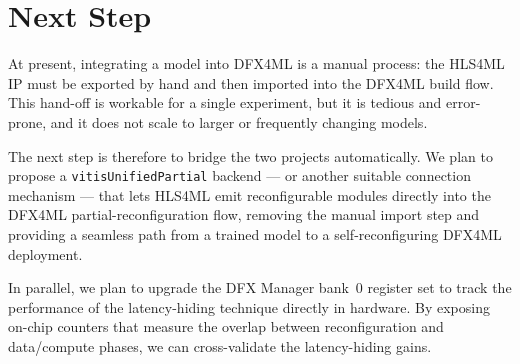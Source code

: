 \documentclass{cernatsnote}
\begin{document}
\section{Next Step}

At present, integrating a model into DFX4ML is a manual process: the HLS4ML IP
must be exported by hand and then imported into the DFX4ML build flow. This
hand-off is workable for a single experiment, but it is tedious and error-prone,
and it does not scale to larger or frequently changing models.

The next step is therefore to bridge the two projects automatically. We plan to
propose a \texttt{vitisUnifiedPartial} backend --- or another suitable
connection mechanism --- that lets HLS4ML emit reconfigurable modules directly
into the DFX4ML partial-reconfiguration flow, removing the manual import step
and providing a seamless path from a trained model to a self-reconfiguring
DFX4ML deployment.

In parallel, we plan to upgrade the DFX Manager bank~0 register set to track the
performance of the latency-hiding technique directly in hardware. By exposing
on-chip counters that measure the overlap between reconfiguration and
data/compute phases, we can cross-validate the latency-hiding gains.
 
\end{document}

